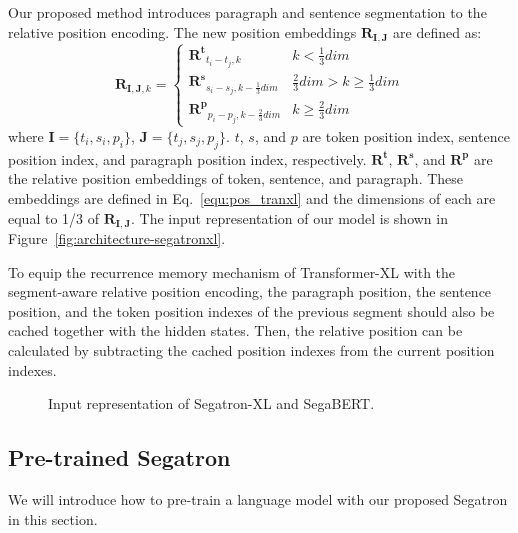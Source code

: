 \documentclass[letterpaper]{article}
\begin{document}
Our proposed method introduces paragraph and sentence segmentation to the relative position encoding. The new position embeddings $\mathbf{R}_{\mathbf{I},\mathbf{J}}$ are defined as:
\begin{equation}\label{equ:pos_segatranxl}
  \mathbf{R}_{\mathbf{I},\mathbf{J},k} = \left\{
  \begin{array}{ll}
    \mathbf{R^t}_{t_i-t_j,k}  &k<\frac{1}{3}dim \\
    \mathbf{R^s}_{s_i-s_j,k-\frac{1}{3}dim}  &\frac{2}{3}dim>k \geq \frac{1}{3}dim \\
    \mathbf{R^p}_{p_i-p_j,k-\frac{2}{3}dim}  &k \geq \frac{2}{3}dim 
  \end{array}
  \right.
\end{equation} 
where $\mathbf{I}=\{t_i,s_i,p_i\}$, $\mathbf{J}=\{t_j,s_j,p_j\}$. 
$t$, $s$, and $p$ are token position index, sentence position index, and paragraph position index, respectively. 
$\mathbf{R^t}$, $\mathbf{R^s}$, and $\mathbf{R^p}$ are the relative position embeddings of token, sentence, and paragraph. 
These embeddings are defined in Eq.~\ref{equ:pos_tranxl} and the dimensions of each are equal to 1/3 of $\mathbf{R}_{\mathbf{I},\mathbf{J}}$.
The input representation of our model is shown in Figure~\ref{fig:architecture-segatronxl}.

To equip the recurrence memory mechanism of Transformer-XL with the segment-aware relative position encoding, the paragraph position, the sentence position, and the token position indexes of the previous segment should also be cached together with the hidden states. Then, the relative position can be calculated by subtracting the cached position indexes from the current position indexes.


\begin{figure}[t]
  \centering
  \subfiguretopcaptrue
  
  \caption{Input representation of Segatron-XL and SegaBERT.}
  \label{fig:architecture}
\end{figure} \subsection{Pre-trained Segatron}
\label{section: model/segabert}
We will introduce how to pre-train a language model with our proposed Segatron in this section.
\end{document}
